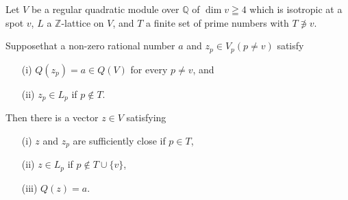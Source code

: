 \begin{lemma}\label{c2:lem-2.32}
Let $V$ be a regular quadratic module over $\mathbb{Q}$ of $\dim
v\geqq 4$ which is isotropic at a spot $v$, $L$ a $\mathbb{Z}$-lattice
on $V$, and $T$ a finite set of prime numbers with $T \not\ni v$. 

Suppose\pageoriginale that a non-zero rational number $a$ and
$z_p \in V_p(p\neq v)$ satisfy
\begin{itemize}
\item[\rm{(i)}] $Q(z_p) = a\in Q(V)$ for every $p\neq v$, and 

\item[\rm{(ii)}] $z_p\in L_p$ if $p\not\in T$.
\end{itemize}

Then there is a vector $z\in V$ satisfying
\begin{itemize}
\item[\rm{(i)}] $z$ and $z_p$ are sufficiently close if $p\in
T$,

\item[\rm{(ii)}] $z\in L_p$ if $p\not\in T \cup \{v\}$,

\item[\rm{(iii)}] $Q(z)=a$.
\end{itemize}
\end{lemma}

